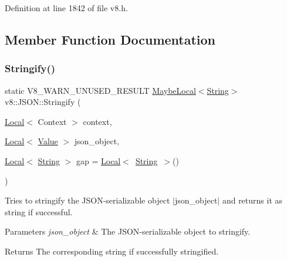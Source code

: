 Definition at line 1842 of file v8.\+h.



\subsection{Member Function Documentation}
\mbox{\label{classv8_1_1JSON_ac5ddb9edc1369a7d889b7ac8411e7b71}} 
\subsubsection{\texorpdfstring{Stringify()}{Stringify()}}
{\footnotesize\ttfamily static V8\+\_\+\+W\+A\+R\+N\+\_\+\+U\+N\+U\+S\+E\+D\+\_\+\+R\+E\+S\+U\+LT \mbox{\hyperlink{classv8_1_1MaybeLocal}{Maybe\+Local}}$<$\mbox{\hyperlink{classv8_1_1String}{String}}$>$ v8\+::\+J\+S\+O\+N\+::\+Stringify (\begin{DoxyParamCaption}\item[{\mbox{\hyperlink{classv8_1_1Local}{Local}}$<$ Context $>$}]{context,  }\item[{\mbox{\hyperlink{classv8_1_1Local}{Local}}$<$ \mbox{\hyperlink{classv8_1_1Value}{Value}} $>$}]{json\+\_\+object,  }\item[{\mbox{\hyperlink{classv8_1_1Local}{Local}}$<$ \mbox{\hyperlink{classv8_1_1String}{String}} $>$}]{gap = {\ttfamily \mbox{\hyperlink{classv8_1_1Local}{Local}}$<$~\mbox{\hyperlink{classv8_1_1String}{String}}~$>$()} }\end{DoxyParamCaption})\hspace{0.3cm}{\ttfamily [static]}}

Tries to stringify the J\+S\+O\+N-\/serializable object $\vert$json\+\_\+object$\vert$ and returns it as string if successful.


\begin{DoxyParams}{Parameters}
{\em json\+\_\+object} & The J\+S\+O\+N-\/serializable object to stringify. \\
\hline
\end{DoxyParams}
\begin{DoxyReturn}{Returns}
The corresponding string if successfully stringified. 
\end{DoxyReturn}
\mbox{\label{classv8_1_1JSON_acc5421b3e5d85d3788a1e6cb59403393}} 

